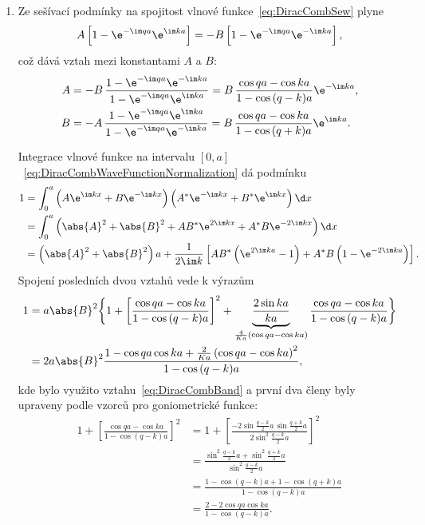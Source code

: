 \begin{solution}
\begin{enumerate}
    \item
        Ze sešívací podmínky na spojitost vlnové funkce~\eqref{eq:DiracCombSew} plyne
        \begin{equation}
            A\left[1-\e^{-\im q a}\e^{\im k a}\right]=-B\left[1-\e^{-\im q a}\e^{-\im k a}\right],
        \end{equation}
        což dává vztah mezi konstantami $A$ a $B$:
        \begin{subequations}
            \begin{align}
                A&=-B\,\frac{1-\e^{-\im q a}\e^{-\im k a}}{1-\e^{-\im q a}\e^{\im k a}}
                =B\,\frac{\cos{qa}-\cos{ka}}{1-\cos{(q-k)a}}\e^{-\im k a},\\
                B&=-A\,\frac{1-\e^{-\im q a}\e^{\im k a}}{1-\e^{-\im q a}\e^{-\im k a}}
                =B\,\frac{\cos{qa}-\cos{ka}}{1-\cos{(q+k)a}}\e^{\im k a}.
            \end{align}
        \end{subequations}

        Integrace vlnové funkce na intervalu $[0,a]$~\eqref{eq:DiracCombWaveFunctionNormalization} dá podmínku
        \begin{align}
            1&=\int_{0}^{a}\left(A\e^{\im kx}+B\e^{-\im kx}\right)\left(A^{*}\e^{-\im kx}+B^{*}\e^{\im kx}\right)\d x\nonumber\\
             &=\int_{0}^{a}\left(\abs{A}^{2}+\abs{B}^{2}+AB^{*}\e^{2\im kx}+A^{*}B\e^{-2\im kx}\right)\d x\nonumber\\
             &=\left(\abs{A}^{2}+\abs{B}^{2}\right)a+\frac{1}{2\im k}\left[AB^{*}\left(\e^{2\im ka}-1\right)+A^{*}B\left(1-\e^{-2\im ka}\right)\right].
        \end{align}
        Spojení posledních dvou vztahů vede k výrazům
        \begin{align}
            1&=a\abs{B}^{2}\bigg\{1+\left[\frac{\cos{qa}-\cos{ka}}{1-\cos{(q-k)a}}\right]^{2}
                +\underbrace{\frac{2\sin{ka}}{ka}}_{\frac{4}{Ka}\left(\cos{qa}-\cos{ka}\right)}\frac{\cos{qa}-\cos{ka}}{1-\cos{(q-k)a}}\bigg\}\nonumber\\
             &=2a\abs{B}^{2}\frac{1-\cos{qa}\cos{ka}+\frac{2}{Ka}\left(\cos{qa}-\cos{ka}\right)^{2}}{1-\cos{(q-k)a}},
        \end{align}
        kde bylo využito vztahu~\eqref{eq:DiracCombBand} a první dva členy byly upraveny podle vzorců pro goniometrické funkce:
        \begin{align}
            1+\left[\frac{\cos{qa}-\cos{ka}}{1-\cos{(q-k)a}}\right]^{2}
                &=1+\left[\frac{-2\sin{\frac{q-k}{2}a}\,\sin{\frac{q+k}{2}a}}{2\sin^{2}\frac{q-k}{2}a}\right]^{2}\nonumber\\
                &=\frac{\sin^{2}{\frac{q-k}{2}a}+\sin^{2}{\frac{q+k}{2}a}}{\sin^{2}{\frac{q-k}{2}a}}\nonumber\\
                &=\frac{1-\cos{(q-k)a}+1-\cos{(q+k)a}}{1-\cos{(q-k)a}}\nonumber\\
                &=\frac{2-2\cos{qa}\cos{ka}}{1-\cos{(q-k)a}}.
        \end{align}
        

\end{enumerate}
\end{solution}
